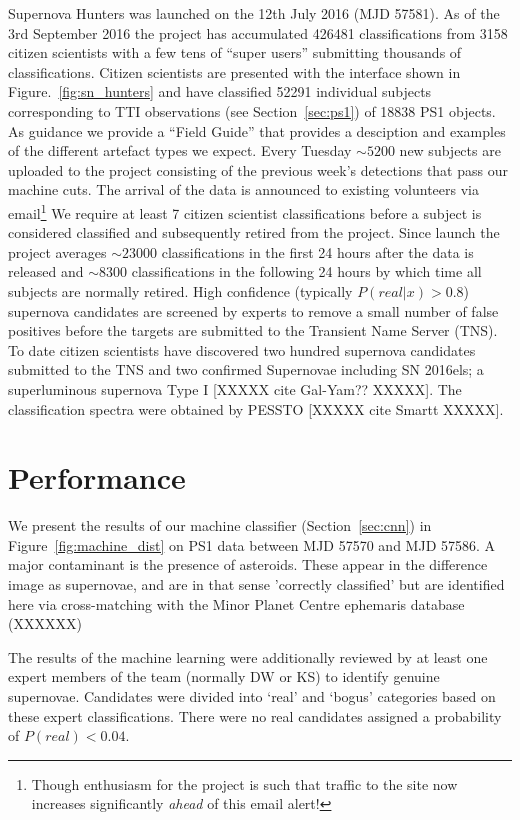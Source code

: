 \documentclass[a4paper,fleqn,usenatbib]{mnras}
\begin{document}
Supernova Hunters was launched on the 12th July 2016 (MJD 57581).  As of the 3rd September 2016 the project has accumulated 426481 classifications from 3158 citizen scientists with a few tens of ``super users'' submitting thousands of classifications.  Citizen scientists are presented with the interface shown in Figure.~\ref{fig:sn_hunters} and have classified 52291 individual subjects corresponding to TTI observations (see Section~\ref{sec:ps1}) of 18838 PS1 objects. As guidance we provide a ``Field Guide'' that provides a desciption and examples of the different artefact types we expect.  Every Tuesday $\sim5200$ new subjects are uploaded to the project consisting of the previous week's detections that pass our machine cuts. The arrival of the data is announced to existing volunteers via email\footnote{Though enthusiasm for the project is such that traffic to the site now increases significantly \emph{ahead} of this email alert!} We require at least 7 citizen scientist classifications before a subject is considered classified and subsequently  retired from the project.  Since launch the project averages $\sim23000$ classifications in the first 24 hours after the data is released and $\sim8300$ classifications in the following 24 hours by which time all subjects are normally retired. High confidence (typically $P(real|x)>0.8$) supernova candidates are screened by experts to remove a small number of false positives before the targets are submitted to the Transient Name Server (TNS).  To date citizen scientists have discovered two hundred supernova candidates submitted to the TNS and two confirmed Supernovae including SN 2016els; a superluminous supernova Type I [XXXXX cite Gal-Yam?? XXXXX].  The classification spectra were obtained by PESSTO [XXXXX cite Smartt XXXXX].

\section{Performance}
\label{sec:perform}

We present the results of our machine classifier (Section~\ref{sec:cnn}) in Figure~\ref{fig:machine_dist} on PS1 data between MJD 57570 and MJD 57586. A major contaminant is the presence of asteroids. These appear in the difference image as  supernovae, and are in that sense 'correctly classified' but are identified here via cross-matching with the Minor Planet Centre ephemaris database (XXXXXX)

The results of the machine learning were additionally reviewed by at least one expert members of the team (normally DW or KS) to identify genuine supernovae. Candidates were divided into `real' and `bogus' categories based on these expert classifications. There were no real candidates assigned a probability of $P(real) < 0.04$. 
\end{document}
